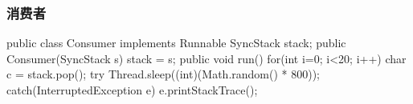 \subsubsection{消费者}
  
\begin{javaCode}
  public class Consumer implements Runnable {
    SyncStack stack;
    public Consumer(SyncStack s) {
      stack = s;
    }
    public void run() {
      for(int i=0; i<20; i++) {
        char c = stack.pop();
        try {
          Thread.sleep((int)(Math.random() * 800));
        } catch(InterruptedException e) {
          e.printStackTrace();
        }
      }
    }
  }
\end{javaCode}
